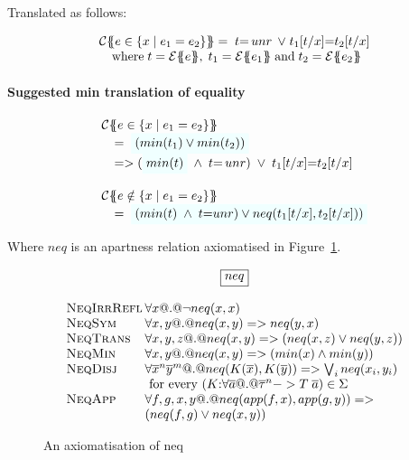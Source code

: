 Translated as follows:

\[\begin{array}{l}
\ctrans{\Sigma}{\Gamma}{e \in \{x \mid e_1 = e_2 \}}
  = \; t{=}\unr \; \lor \; t_1[t/x]{=}t_2[t/x] \\
\quad \text{where} \;
   t = \etrans{\Sigma}{\Gamma}{e}, \;
   t_1 = \etrans{\Sigma}{\Gamma}{e_1} \; \text{and} \;
   t_2 = \etrans{\Sigma}{\Gamma}{e_2}
\end{array}\]

\paragraph{Suggested min translation of equality}

\[\begin{array}{l}
\ctrans{\Sigma}{\Gamma}{e \in \{x \mid e_1 = e_2 \}} \\
\quad = \; \formula{( min(t_1) \lor min(t_2) )} \\ %
\quad => (\formula{min(t)} \; \land \; t{=}\unr) \; \lor \; t_1[t/x]{=}t_2[t/x] \\ \\
\ctrans{\Sigma}{\Gamma}{e \notin \{x \mid e_1 = e_2 \}} \\
\quad = \; \formula{(min(t) \; \land \; t{=}unr) \lor neq(t_1[t/x],t_2[t/x]))}
\end{array}\]

Where $neq$ is an apartness relation axiomatised in Figure~\ref{fig:neq-axioms}.


\begin{figure}
{\small
\[\setlength{\arraycolsep}{1pt}
\begin{array}{c}
 \ruleform{neq} \\ \\
\begin{array}{lll}
 \textsc{NeqIrrRefl} & \forall x @.@ \neg neq(x,x) \\
 \textsc{NeqSym}     & \forall x, y @.@ neq(x,y) => neq(y,x) \\
 \textsc{NeqTrans}   & \forall x, y, z @.@ neq(x,y) => (neq(x,z) \lor neq(y,z)) \\
 \textsc{NeqMin}     & \forall x, y @.@ neq(x,y) => (min(x) \land min(y)) \\
 \textsc{NeqDisj}    & \forall \oln{x}{n}\oln{y}{m} @.@ neq(K(\ol{x}),K(\ol{y})) => \bigvee_i neq(x_i,y_i) \\
                     & \text{ for every } (K{:}\forall\as @.@ \oln{\tau}{n} -> T\;\as) \in \Sigma \\
 \textsc{NeqApp}     & \forall f, g, x, y @.@ neq(app(f,x),app(g,y)) => \\
                     & (neq(f,g) \lor neq(x,y))
\end{array}
\end{array}\]}
\caption{An axiomatisation of neq
    \label{fig:neq-axioms}}
\end{figure}

